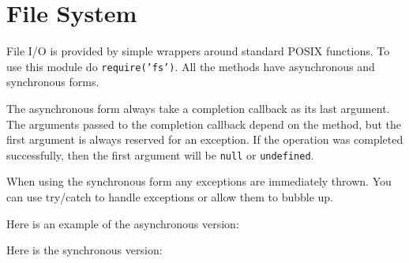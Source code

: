 \section{File System}

\begin{Shaded}
\begin{Highlighting}[]
\NormalTok{: } 
\end{Highlighting}
\end{Shaded}

File I/O is provided by simple wrappers around standard POSIX functions.
To use this module do \texttt{require('fs')}. All the methods have
asynchronous and synchronous forms.

The asynchronous form always take a completion callback as its last
argument. The arguments passed to the completion callback depend on the
method, but the first argument is always reserved for an exception. If
the operation was completed successfully, then the first argument will
be \texttt{null} or \texttt{undefined}.

When using the synchronous form any exceptions are immediately thrown.
You can use try/catch to handle exceptions or allow them to bubble up.

Here is an example of the asynchronous version:

\begin{Shaded}
\begin{Highlighting}[]
 \NormalTok{);}

\NormalTok{(}\NormalTok{, } 
    
  \NormalTok{(}\NormalTok{);}
\NormalTok{\});}
\end{Highlighting}
\end{Shaded}

Here is the synchronous version:

\begin{Shaded}
\begin{Highlighting}[]
 \NormalTok{);}

\NormalTok{(}\NormalTok{)}
\NormalTok{(}\NormalTok{);}
\end{Highlighting}
\end{Shaded}

